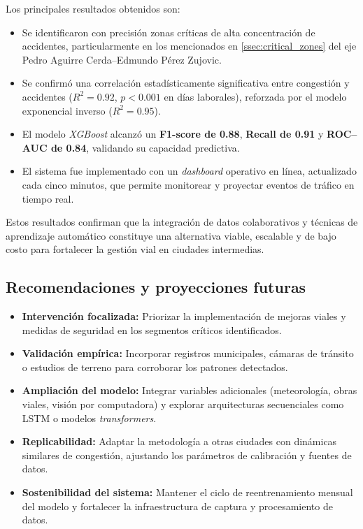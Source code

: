 \documentclass[12pt]{article}
\begin{document}
Los principales resultados obtenidos son:
\begin{itemize}
\item Se identificaron con precisión zonas críticas de alta concentración de accidentes, particularmente en los mencionados en \autoref{ssec:critical_zones} del eje Pedro Aguirre Cerda–Edmundo Pérez Zujovic.
\item Se confirmó una correlación estadísticamente significativa entre congestión y accidentes ($R^2 = 0.92$, $p < 0.001$ en días laborales), reforzada por el modelo exponencial inverso ($R^2 = 0.95$).
\item El modelo \textit{XGBoost} alcanzó un \textbf{F1-score de 0.88}, \textbf{Recall de 0.91} y \textbf{ROC–AUC de 0.84}, validando su capacidad predictiva.
\item El sistema fue implementado con un \textit{dashboard} operativo en línea, actualizado cada cinco minutos, que permite monitorear y proyectar eventos de tráfico en tiempo real.
\end{itemize}

Estos resultados confirman que la integración de datos colaborativos y técnicas de aprendizaje automático constituye una alternativa viable, escalable y de bajo costo para fortalecer la gestión vial en ciudades intermedias.

\subsection*{Recomendaciones y proyecciones futuras}

\begin{itemize}
\item \textbf{Intervención focalizada:} Priorizar la implementación de mejoras viales y medidas de seguridad en los segmentos críticos identificados.
\item \textbf{Validación empírica:} Incorporar registros municipales, cámaras de tránsito o estudios de terreno para corroborar los patrones detectados.
\item \textbf{Ampliación del modelo:} Integrar variables adicionales (meteorología, obras viales, visión por computadora) y explorar arquitecturas secuenciales como LSTM o modelos \textit{transformers}.
\item \textbf{Replicabilidad:} Adaptar la metodología a otras ciudades con dinámicas similares de congestión, ajustando los parámetros de calibración y fuentes de datos.
\item \textbf{Sostenibilidad del sistema:} Mantener el ciclo de reentrenamiento mensual del modelo y fortalecer la infraestructura de captura y procesamiento de datos.
\end{itemize}
\end{document}
